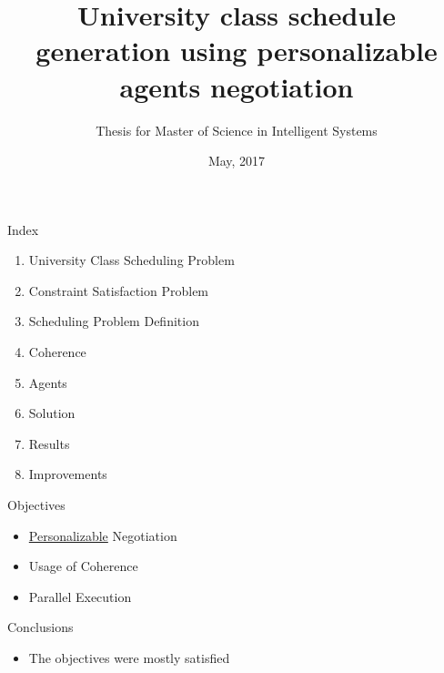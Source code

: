 \documentclass{beamer}
\title{University class schedule generation using personalizable agents negotiation}
\subtitle{Thesis for Master of Science in Intelligent Systems}
\institute[ITESM]{Tecnol\'{o}gico de Monterrey}
\date{May, 2017}
\begin{document}
\frame{\titlepage}


\begin{frame}{Index}
  \begin{enumerate}[I]
    \item University Class Scheduling Problem
    \item Constraint Satisfaction Problem
    \item Scheduling Problem Definition
    \item Coherence
    \item Agents
    \item Solution
    \item Results
    \item Improvements
  \end{enumerate}
\end{frame}


\begin{frame}{Objectives}
  \begin{itemize}
    \item \underline{Personalizable} Negotiation
    \item Usage of Coherence
    \item Parallel Execution
  \end{itemize}
\end{frame}






\begin{frame}{Conclusions}
  \centering
  \begin{itemize}
    \item The objectives were mostly satisfied
  \end{itemize}
\end{frame}


\end{document}
